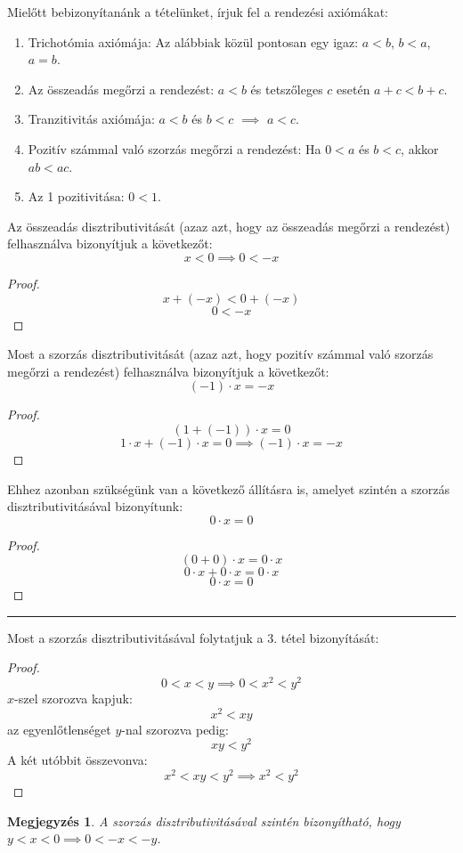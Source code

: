 \documentclass{article}
\newtheorem{remark}{Megjegyzés}
\begin{document}
Mielőtt bebizonyítanánk a tételünket, írjuk fel a rendezési axiómákat:
\begin{enumerate}
    \item Trichotómia axiómája: Az alábbiak közül pontosan egy igaz: $a < b$, $b < a$, $a = b$.
    \item Az összeadás megőrzi a rendezést: $a < b$ és tetszőleges $c$ esetén $a + c < b + c$.
    \item Tranzitivitás axiómája: $a < b$ és $b < c$ $\implies$ $a < c$.
    \item Pozitív számmal való szorzás megőrzi a rendezést: Ha $0 < a$ és $b < c$, akkor $ab < ac$.
    \item Az 1 pozitivitása: $0 < 1$.
\end{enumerate}
Az összeadás disztributivitását (azaz azt, hogy az összeadás megőrzi a rendezést) felhasználva bizonyítjuk a következőt:
\[
    x < 0 \implies 0 < -x
\]
\begin{proof}
\[
    x + (-x) < 0 + (-x)
\]
\[
    0 < -x
\]
\end{proof}
Most a szorzás disztributivitását (azaz azt, hogy pozitív számmal való szorzás megőrzi a rendezést) felhasználva bizonyítjuk a következőt:
\[
    (-1)\cdot x = -x
\]
\begin{proof}
\[
    (1 + (-1)) \cdot x = 0
\]
\[
    1 \cdot x + (-1) \cdot x = 0 \implies (-1) \cdot x = -x
\]
\end{proof}
Ehhez azonban szükségünk van a következő állításra is, amelyet szintén a szorzás disztributivitásával bizonyítunk:
\[
    0\cdot x = 0
\]
\begin{proof}
\[
    (0+0) \cdot x = 0 \cdot x
\]
\[
    0 \cdot x + 0 \cdot x = 0 \cdot x
\]
\[
    0 \cdot x = 0
\]
\end{proof}

\hrule
\vspace{1em}

Most a szorzás disztributivitásával folytatjuk a 3. tétel bizonyítását:

\begin{proof}
    \[
    0 < x < y \implies 0 < x^2 < y^2
    \]
    $x$-szel szorozva kapjuk:
    \[
    x^2 < xy
    \]
    az egyenlőtlenséget $y$-nal szorozva pedig:
    \[
    xy < y^2
    \]
    A két utóbbit összevonva:
    \[
    x^2 < xy < y^2 \implies x^2 < y^2
    \]
\end{proof}

\begin{remark}
    A szorzás disztributivitásával szintén bizonyítható, hogy $y < x < 0 \implies 0 < -x < -y$.
\end{remark}
\end{document}
